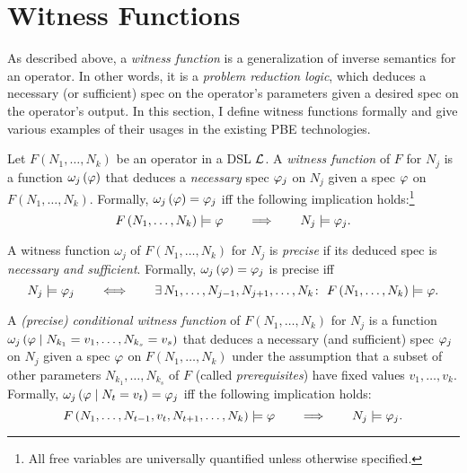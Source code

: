 \section{Witness Functions}
\label{sec:prose:wf}
As described above, a \emph{witness function} is a generalization of inverse semantics for an operator.
In other words, it is a \emph{problem reduction logic}, which deduces a necessary (or sufficient) spec on the operator's
parameters given a desired spec on the operator's output.
In this section, I define witness functions formally and give various examples of their usages in the existing PBE
technologies.

\begin{defn}
    Let $F\left(N_1,\dots,N_k\right)$ be an operator in a DSL $\mathcal{L}$.
    A \emph{witness function} of $F$ for $N_j$ is a function $\omega_{j}\left(\varphi\right)$ that deduces a
    \emph{necessary} spec $\varphi_j$ on $N_j$ given a spec $\varphi$ on $F\left(N_1, \dots, N_k\right)$.
    Formally, $\omega_j\left(\varphi\right) = \varphi_j$ iff the following implication holds:\footnote{All free variables
        are universally quantified unless otherwise specified.}
    \begin{equation*}
        F\left(N_1, \dots, N_k\right) \models \varphi \qquad\Longrightarrow\qquad N_j \models \varphi_j.
    \end{equation*}
\end{defn}

\begin{defn}
    A witness function $\omega_j$ of $F\left(N_1, \dots, N_k\right)$ for $N_j$ is \emph{precise} if its deduced spec is
    \emph{necessary and sufficient}.
    Formally, $\omega_j\left(\varphi\right) = \varphi_j$ is precise iff
    \begin{equation*}
        N_j \models \spec_j \qquad\Longleftrightarrow\qquad
        \exists\, N_1, \dots, N_{j-1}, N_{j+1}, \dots, N_k\colon\ F\left(N_1, \dots, N_k\right) \models \spec.
    \end{equation*}
\end{defn}

\begin{defn}
    A \emph{(precise) conditional witness function} of $F\left(N_1, \dots, N_k\right)$ for $N_j$ is a function
    $\omega_j\left(\spec \assuming N_{k_1} = v_1, \dots, N_{k_s} = v_s\right)$ that deduces a necessary (and sufficient)
    spec $\varphi_j$ on $N_j$ given a spec $\varphi$ on $F\left(N_1, \dots, N_k\right)$ under the assumption that a subset
    of other parameters $N_{k_1}, \dots, N_{k_s}$ of $F$ (called \emph{prerequisites}) have fixed values $v_1, \dots,
    v_k$.
    Formally, $\omega_j\left(\spec \assuming N_t = v_t\right) = \spec_j$ iff the following implication holds:
    \begin{equation*}
        F\left(N_1, \dots, N_{t-1}, v_t, N_{t+1}, \dots, N_k\right) \models \varphi
        \qquad\Longrightarrow\qquad
        N_j \models \varphi_j.
    \end{equation*}
\end{defn}


